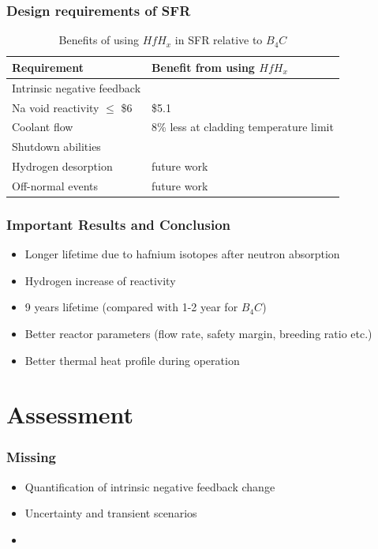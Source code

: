 \documentclass[9pt]{beamer}
\newcommand{\hfh}{$HfH_{x}$\xspace}
\newcommand{\bc}{$B_4C$\xspace}
\begin{document}
\begin{frame}
\frametitle{Design requirements of \gls{SFR}}
    \begin{table}[h]
      \centering 
      \begin{tabularx}{\textwidth}{mb}
      \hline
      Requirement & Benefit from using \hfh \\ 
      \hline
      Intrinsic negative feedback &     \\ 
      Na void reactivity $\leq$ \$6 & \$5.1\\ 
      Coolant flow &  8\% less at cladding temperature limit  \\
      Shutdown abilities &  \\ 
      Hydrogen desorption & future work\\ 
      Off-normal events & future work \\ 
      \hline
      \end{tabularx}
      \caption {Benefits of using \hfh in \gls{SFR} relative to \bc}
      \label{tab:ben}
    \end{table}
\end{frame}


\begin{frame}
\frametitle{Important Results and Conclusion}
\begin{itemize}
  \item Longer lifetime due to hafnium isotopes after neutron absorption
  \item Hydrogen increase of reactivity
  \item 9 years lifetime (compared with 1-2 year for \bc)
  \item Better reactor parameters (flow rate, safety margin, breeding ratio etc.)
  \item Better thermal heat profile during operation
\end{itemize}
\end{frame}

\section{Assessment}

\begin{frame}
\frametitle{Missing}
\begin{itemize}
  \item Quantification of intrinsic negative feedback change
  \item Uncertainty and transient scenarios
  \item 
\end{itemize}
\end{frame}
\end{document}
